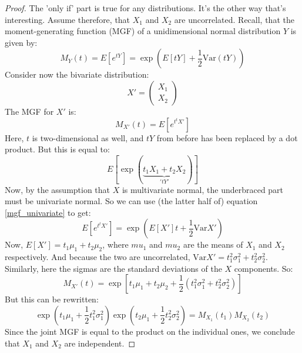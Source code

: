 \documentclass[12pt, a4paper]{article}
\numberwithin{equation}{section}
\begin{document}
\begin{proof}
The 'only if' part is true for any distributions. It's the other way that's interesting. Assume therefore, that $X_1$ and $X_2$ are uncorrelated. Recall, that the moment-generating function (MGF) of a unidimensional normal distribution $Y$ is given by:
\begin{equation}
\label{mgf_univariate}
M_Y(t)=E\left[e^{tY}\right]=\exp\left(E[tY]+\frac{1}{2}\textrm{Var}(tY)\right)
\end{equation}
Consider now the bivariate distribution:
\begin{equation}
X'=
\begin{pmatrix}
X_1 \\ X_2
\end{pmatrix}
\end{equation}
The MGF for $X'$ is:
\begin{equation}
M_{X'}(t)=E\left[e^{t^t X'}\right]
\end{equation}
Here, $t$ is two-dimensional as well, and $tY$ from before has been replaced by a dot product. But this is equal to:
\begin{equation}
E\left[\exp(\underbrace{t_1 X_1 + t_2 X_2}_{'tY'})\right]
\end{equation}
Now, by the assumption that $X$ is multivariate normal, the underbraced part must be univariate normal. So we can use (the latter half of) equation \ref{mgf_univariate} to get:
\begin{equation}
E\left[e^{t^t X'}\right]=\exp\left(E[X']t+\frac{1}{2}\textrm{Var}X'\right)
\end{equation}
Now, $E[X']=t_1\mu_1+t_2\mu_2$, where $mu_1$ and $mu_2$ are the means of $X_1$ and $X_2$ respectively. And because the two are uncorrelated, $\textrm{Var}X'=t_1^2\sigma_1^2+t_2^2\sigma_2^2$. Similarly, here the sigmas are the standard deviations of the $X$ components. So:
\begin{equation}
M_{X'}(t)=\exp\left[t_1\mu_1+t_2\mu_2+\frac{1}{2}\left(t_1^2\sigma_1^2+t_2^2\sigma_2^2\right)\right]
\end{equation}
But this can be rewritten:
\begin{equation}
\exp\left(t_1\mu_1+\frac{1}{2}t_1^2\sigma_1^2\right)\exp\left(t_2\mu_1+\frac{1}{2}t_2^2\sigma_2^2\right)=M_{X_1}(t_1)M_{X_2}(t_2)
\end{equation}
Since the joint MGF is equal to the product on the individual ones, we conclude that $X_1$ and $X_2$ are independent.
\end{proof}
\end{document}
